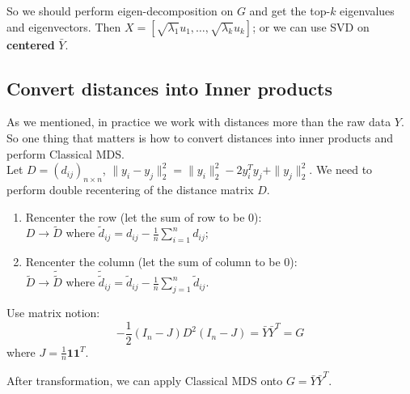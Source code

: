 \documentclass[12pt]{book}
\theoremstyle{definition}
\theoremstyle{remark}
\begin{document}
So we should perform eigen-decomposition on $G$ and get the top-$k$ eigenvalues and eigenvectors. Then $X = [\sqrt{\lambda_1}u_1, \dots,\sqrt{\lambda_k}u_k]$; or we can use SVD on \textbf{centered} $\bar{Y}$.

\subsection{Convert distances into Inner products}
As we mentioned, in practice we work with distances more than the raw data $Y$. So one thing that matters is how to convert distances into inner products and perform Classical MDS.\\

Let $D = (d_{ij})_{n\times n}$, $\|y_i - y_j\|_2^2 = \|y_i\|_2^2 - 2y_i^Ty_j + \|y_j\|_2^2$. We need to perform double recentering of the distance matrix $D$. \\

\begin{enumerate}
    \item Rencenter the row (let the sum of row to be 0):\\
    $D \rightarrow \widetilde{D}$ where $\tilde{d}_{ij} = d_{ij} - \frac1n \sum_{i=1}^n d_{ij}$;
    \item Rencenter the column (let the sum of column to be 0):\\
    $\widetilde{D} \rightarrow \widetilde{\widetilde{D}}$ where $\tilde{\tilde{d}}_{ij} = \tilde{d}_{ij} - \frac1n \sum_{j=1}^n \tilde{d}_{ij}$.
\end{enumerate}

Use matrix notion: \[-\frac12(I_n - J)D^2(I_n - J) = \bar{Y}\bar{Y}^T = G\]
where $J = \frac1n\mathbf{1}\mathbf{1}^T$.

After transformation, we can apply Classical MDS onto $G = \bar{Y}\bar{Y}^T$.
\end{document}
